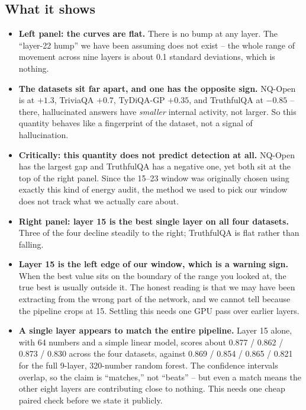 \documentclass[11pt,a4paper]{article}
\begin{document}
\subsection*{What it shows}
\begin{itemize}
\item \textbf{Left panel: the curves are flat.} There is no bump at any layer. The ``layer-22
hump'' we have been assuming does not exist -- the whole range of movement across nine layers is
about 0.1 standard deviations, which is nothing.

\item \textbf{The datasets sit far apart, and one has the opposite sign.} NQ-Open is at $+1.3$,
TriviaQA $+0.7$, TyDiQA-GP $+0.35$, and TruthfulQA at $-0.85$ -- there, hallucinated answers have
\emph{smaller} internal activity, not larger. So this quantity behaves like a fingerprint of the
dataset, not a signal of hallucination.

\item \textbf{Critically: this quantity does not predict detection at all.} NQ-Open has the
largest gap and TruthfulQA has a negative one, yet both sit at the top of the right panel. Since
the 15--23 window was originally chosen using exactly this kind of energy audit, the method we
used to pick our window does not track what we actually care about.

\item \textbf{Right panel: layer 15 is the best single layer on all four datasets.} Three of the
four decline steadily to the right; TruthfulQA is flat rather than falling.

\item \textbf{Layer 15 is the left edge of our window, which is a warning sign.} When the best
value sits on the boundary of the range you looked at, the true best is usually outside it. The
honest reading is that we may have been extracting from the wrong part of the network, and we
cannot tell because the pipeline crops at 15. Settling this needs one GPU pass over earlier
layers.

\item \textbf{A single layer appears to match the entire pipeline.} Layer 15 alone, with 64
numbers and a simple linear model, scores about 0.877 / 0.862 / 0.873 / 0.830 across the four
datasets, against 0.869 / 0.854 / 0.865 / 0.821 for the full 9-layer, 320-number random forest.
The confidence intervals overlap, so the claim is ``matches,'' not ``beats'' -- but even a match
means the other eight layers are contributing close to nothing. This needs one cheap paired check
before we state it publicly.
\end{itemize}
\end{document}
